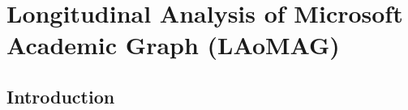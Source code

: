 
\graphicspath{{Chapter1/Figures/}}



\chapter{Longitudinal Analysis of Microsoft Academic Graph (LAoMAG)}


\section{Introduction}
\label{S:1}

